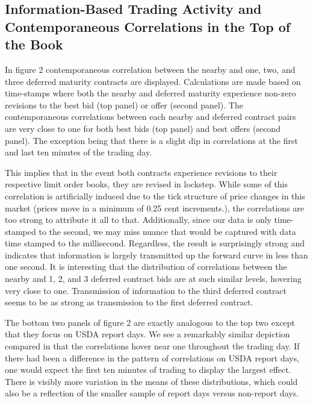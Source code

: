 \documentclass[]{elsarticle} %
\begin{document}
\subsection{Information-Based Trading Activity and Contemporaneous
Correlations in the Top of the
Book}\label{information-based-trading-activity-and-contemporaneous-correlations-in-the-top-of-the-book-1}

In figure 2 contemporaneous correlation between the nearby and one, two,
and three deferred maturity contracts are displayed. Calculations are
made based on time-stamps where both the nearby and deferred maturity
experience non-zero revisions to the best bid (top panel) or offer
(second panel). The contemporaneous correlations between each nearby and
deferred contract pairs are very close to one for both best bids (top
panel) and best offers (second panel). The exception being that there is
a slight dip in correlations at the first and last ten minutes of the
trading day.

This implies that in the event both contracts experience revisions to
their respective limit order books, they are revised in lockstep. While
some of this correlation is artificially induced due to the tick
structure of price changes in this market (prices move in a minimum of
0.25 cent increments.), the correlations are too strong to attribute it
all to that. Additionally, since our data is only time-stamped to the
second, we may miss nuance that would be captured with data time stamped
to the millisecond. Regardless, the result is surprisingly strong and
indicates that information is largely transmitted up the forward curve
in less than one second. It is interesting that the distribution of
correlations between the nearby and 1, 2, and 3 deferred contract bids
are at such similar levels, hovering very close to one. Transmission of
information to the third deferred contract seems to be as strong as
transmission to the first deferred contract.

The bottom two panels of figure 2 are exactly analogous to the top two
except that they focus on USDA report days. We see a remarkably similar
depiction compared in that the correlations hover near one throughout
the trading day. If there had been a difference in the pattern of
correlations on USDA report days, one would expect the first ten minutes
of trading to display the largest effect. There is visibly more
variation in the means of these distributions, which could also be a
reflection of the smaller sample of report days versus non-report days.
\end{document}
